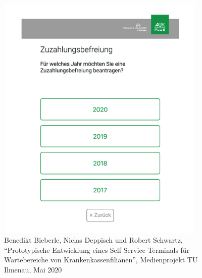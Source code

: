 \begin{figure}[htp]
    \centering
    \includegraphics[width=10cm , height=12cm]{Bilder/Interface.png}
    \caption{Benedikt Bieberle, Niclas Deppisch und Robert Schwartz, "`Prototypische Entwicklung eines Self-Service-Terminals für Wartebereiche von Krankenkassenfilianen"', Medienprojekt TU Ilmenau, Mai 2020}
    \label{fig:Interface}
\end{figure}
